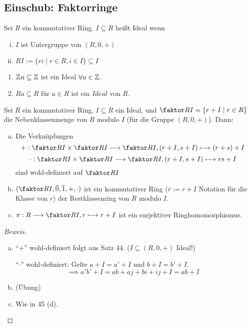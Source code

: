 \documentclass[a4paper]{report}
\begin{document}
\subsection*{Einschub: Faktorringe}
\begin{defi}
  Sei $R$ ein kommutativer Ring. $I \subseteq R$ heißt Ideal wenn
  \begin{enumerate}[(i)]
    \item $I$ ist Untergruppe von $(R, 0, +)$
    \item $RI := \{ri \mid r \in R, i \in I\} \subseteq I$
  \end{enumerate}
\end{defi}
\begin{bsp*}
  \begin{enumerate}[1)]
    \item $\Bbb Zn \subseteq \Bbb Z$ ist ein Ideal $\forall n \in \Bbb Z$.
    \item $Ra \subseteq R$ für $a \in R$ ist ein $Ideal$ von $R$.
  \end{enumerate}
\end{bsp*}

\begin{satz}
  Sei $R$ ein kommutativer Ring, $I \subseteq R$ ein Ideal, und $\faktor RI = \{r + I \mid r \in R\}$ die Nebenklassenmenge von $R$ modulo $I$ (für die Gruppe $(R, 0, +)$). Dann:
  \begin{enumerate}[(a)]
    \item Die Verknüpfungen $$+ : \faktor RI \times \faktor RI \longrightarrow \faktor RI, (r+I, s+I) \longmapsto (r+s)+I$$
          $$\cdot : \faktor RI \times \faktor RI \longrightarrow \faktor RI, (r+I, s+I) \longmapsto rs+I$$
          sind wohl-definiert auf $\faktor RI$

    \item $(\faktor RI, \overline 0, \overline 1, +, \cdot)$ ist ein kommutativer Ring ($\overline r := r + I$ Notation für die Klasse von $r$) der Restklassenring von $R$ modulo $I$.
    \item $\pi : R \longrightarrow \faktor RI, r \longmapsto r+I$ ist ein surjektiver Ringhomomorphismus.
  \end{enumerate}
\begin{proof}[Beweis]
\begin{enumerate}[(a)]
  \item ``$+$'' wohl-definiert folgt aus Satz 44. ($I \subseteq (R, 0, +)$ Ideal!)

        ``$\cdot$''  wohl-definiert: Gelte $a+I = a'+I$ und $b+I = b'+I$.
        $$\implies a'b' + I = ab + aj + bi + ij + I = ab + I$$
  \item (Übung)
  \item Wie in 45 (d). \qedhere
\end{enumerate}
\end{proof}
\end{satz}
\end{document}

